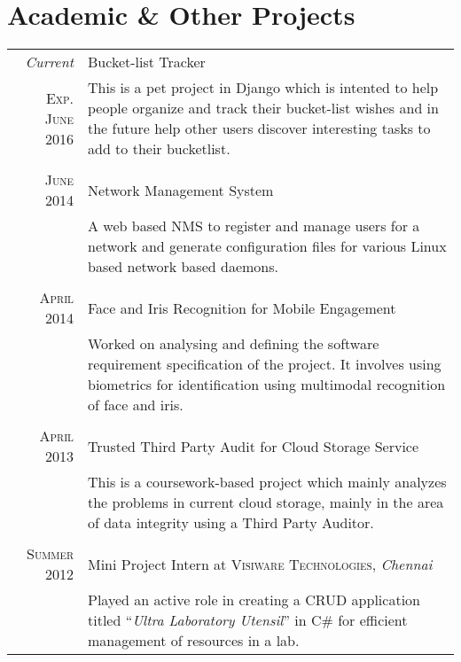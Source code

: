 \documentclass[a4paper,10pt]{article}
\begin{document}
\section{Academic \& Other Projects}
\begin{tabular}{r|p{11cm}}
 
  \emph{Current} & Bucket-list Tracker \\
  \textsc{Exp. June 2016} & \footnotesize{This is a pet project in Django which is intented to help people organize and track their bucket-list wishes and in the future help other users discover interesting tasks to add to their bucketlist. }\\\multicolumn{2}{c}{} \\
 
 \textsc{June 2014} & Network Management System \\&\footnotesize{A web based NMS to register and manage users for a network and generate configuration files for various Linux based network based daemons.}\\\multicolumn{2}{c}{} \\
 
\textsc{April 2014} & Face and Iris Recognition for Mobile Engagement \\&\footnotesize{Worked on analysing and defining the software requirement specification of the project. It involves using biometrics for identification using multimodal recognition of face and iris. }\\\multicolumn{2}{c}{} \\
 
 \textsc{April 2013} & Trusted Third Party Audit for Cloud Storage Service \\&\footnotesize{This is a coursework-based project which mainly analyzes the problems in current cloud storage, mainly in the area of data integrity using a Third Party Auditor. }\\\multicolumn{2}{c}{} \\
 
\textsc{Summer 2012} & Mini Project Intern at \textsc{Visiware Technologies}, \emph{Chennai}\\&\footnotesize{Played an active role in creating a CRUD application titled ``\emph{Ultra Laboratory Utensil}'' in C\# for efficient management of resources in a lab.}
\end{tabular}

\end{document}
